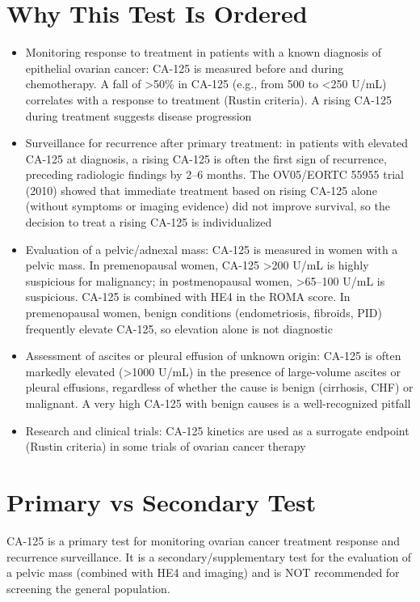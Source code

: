 \section*{Why This Test Is Ordered}
\begin{itemize}
  \item Monitoring response to treatment in patients with a known diagnosis of epithelial ovarian cancer: CA-125 is measured before and during chemotherapy. A fall of >50\% in CA-125 (e.g., from 500 to <250 U/mL) correlates with a response to treatment (Rustin criteria). A rising CA-125 during treatment suggests disease progression
  \item Surveillance for recurrence after primary treatment: in patients with elevated CA-125 at diagnosis, a rising CA-125 is often the first sign of recurrence, preceding radiologic findings by 2--6 months. The OV05/EORTC 55955 trial (2010) showed that immediate treatment based on rising CA-125 alone (without symptoms or imaging evidence) did not improve survival, so the decision to treat a rising CA-125 is individualized
  \item Evaluation of a pelvic/adnexal mass: CA-125 is measured in women with a pelvic mass. In premenopausal women, CA-125 >200 U/mL is highly suspicious for malignancy; in postmenopausal women, >65--100 U/mL is suspicious. CA-125 is combined with HE4 in the ROMA score. In premenopausal women, benign conditions (endometriosis, fibroids, PID) frequently elevate CA-125, so elevation alone is not diagnostic
  \item Assessment of ascites or pleural effusion of unknown origin: CA-125 is often markedly elevated (>1000 U/mL) in the presence of large-volume ascites or pleural effusions, regardless of whether the cause is benign (cirrhosis, CHF) or malignant. A very high CA-125 with benign causes is a well-recognized pitfall
  \item Research and clinical trials: CA-125 kinetics are used as a surrogate endpoint (Rustin criteria) in some trials of ovarian cancer therapy
\end{itemize}

\section*{Primary vs Secondary Test}
CA-125 is a primary test for monitoring ovarian cancer treatment response and recurrence surveillance. It is a secondary/supplementary test for the evaluation of a pelvic mass (combined with HE4 and imaging) and is NOT recommended for screening the general population.

